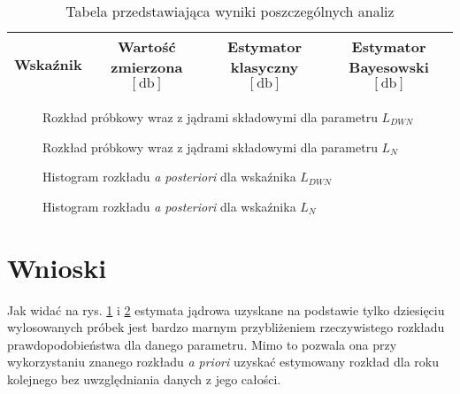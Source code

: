 \documentclass[polish,a4paper,11pt]{mwart}
\let\Oldsection\section
\renewcommand{\section}{\FloatBarrier\Oldsection}
\begin{document}
\begin{table}[!tbh]
  \centering
  \caption{Tabela przedstawiająca wyniki poszczególnych analiz}
  \begin{tabular}{|c|c|c|c|}
    \hline
    Wskaźnik & \makecell{Wartość \\ zmierzona \\ $[\si{\decibel}]$} & \makecell{Estymator \\
    klasyczny \\ $[\si{\decibel}]$} & \makecell{Estymator \\ Bayesowski \\ $[\si{\decibel}]$} \\\hline
    
  \end{tabular}
  \label{tab:wyniki}
\end{table}

\begin{figure}[!tbh]
  \centering
  
  \caption{Rozkład próbkowy wraz z jądrami składowymi dla parametru $L_{DWN}$}
  \label{plot:kernel_ldwn}
\end{figure}

\begin{figure}[!tbh]
  \centering
  
  \caption{Rozkład próbkowy wraz z jądrami składowymi dla parametru $L_{N}$}
  \label{plot:kernel_ln}
\end{figure}

\begin{figure}[!tbh]
  \centering
  
  \caption{Histogram rozkładu \textit{a posteriori} dla wskaźnika $L_{DWN}$}
  \label{plot:hist_ldwn}
\end{figure}

\begin{figure}[!tbh]
  \centering
  
  \caption{Histogram rozkładu \textit{a posteriori} dla wskaźnika $L_{N}$}
  \label{plot:hist_ldwn}
\end{figure}

\section{Wnioski}

Jak widać na rys. \ref{plot:kernel_ldwn} i \ref{plot:kernel_ln} estymata jądrowa
uzyskane na podstawie tylko dziesięciu wylosowanych próbek jest bardzo marnym
przybliżeniem rzeczywistego rozkładu prawdopodobieństwa dla danego parametru.
Mimo to pozwala ona przy wykorzystaniu znanego rozkładu \textit{a priori}
uzyskać estymowany rozkład dla roku kolejnego bez uwzględniania danych z jego
całości.
\end{document}
